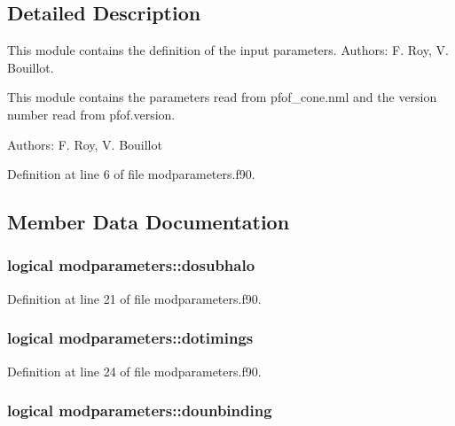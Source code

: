 \subsection{Detailed Description}
This module contains the definition of the input parameters. Authors\-: F. Roy, V. Bouillot. 

This module contains the parameters read from pfof\-\_\-cone.\-nml and the version number read from pfof.\-version.

Authors\-: F. Roy, V. Bouillot 

Definition at line 6 of file modparameters.\-f90.



\subsection{Member Data Documentation}
\hypertarget{classmodparameters_ae2628157b1f65431117f867006409948}{
\subsubsection[{dosubhalo}]{\setlength{\rightskip}{0pt plus 5cm}logical modparameters\-::dosubhalo}}\label{classmodparameters_ae2628157b1f65431117f867006409948}


Definition at line 21 of file modparameters.\-f90.

\hypertarget{classmodparameters_a3d21125b69403e3097f85434aa2bb08d}{
\subsubsection[{dotimings}]{\setlength{\rightskip}{0pt plus 5cm}logical modparameters\-::dotimings}}\label{classmodparameters_a3d21125b69403e3097f85434aa2bb08d}


Definition at line 24 of file modparameters.\-f90.

\hypertarget{classmodparameters_a80bb718489050f3b3c056aae1774984d}{
\subsubsection[{dounbinding}]{\setlength{\rightskip}{0pt plus 5cm}logical modparameters\-::dounbinding}}\label{classmodparameters_a80bb718489050f3b3c056aae1774984d}


